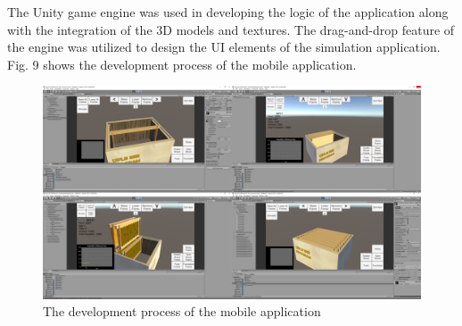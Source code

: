 \documentclass[journal]{./IEEE/IEEEtran}
\begin{document}
\indent The Unity game engine was used in developing the logic of the application along with the integration of the 3D models and textures. The drag-and-drop feature of the engine was utilized to design the UI elements of the simulation application. Fig. 9 shows the development process of the mobile application.
\begin{figure}[H]
\includegraphics[scale=0.2]{./images/unity-dev-process.png}
\centering
\caption{The development process of the mobile application}
\centering
\end{figure}

\end{document}
